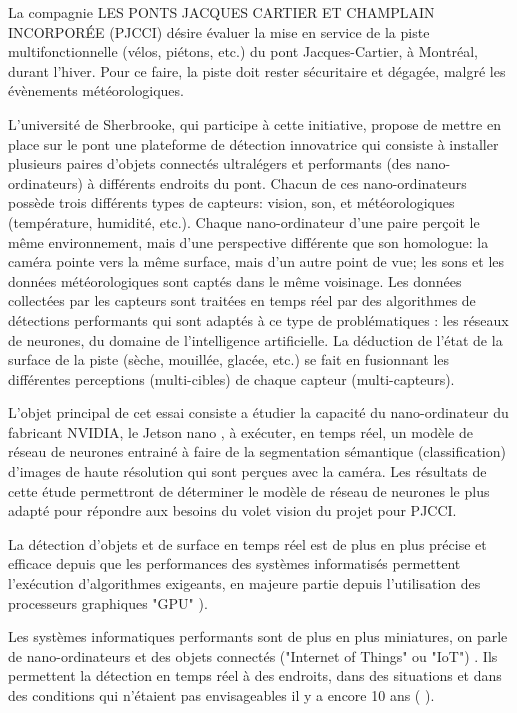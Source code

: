 \par La compagnie LES PONTS JACQUES CARTIER ET CHAMPLAIN INCORPORÉE (PJCCI) désire évaluer la mise en service de la piste multifonctionnelle (vélos, piétons, etc.) du pont Jacques-Cartier, à Montréal, durant l'hiver. Pour ce faire, la piste doit rester sécuritaire et dégagée, malgré les évènements météorologiques.
\par L'université de Sherbrooke, qui participe à cette initiative, propose de mettre en place sur le pont une plateforme de détection innovatrice qui consiste à installer plusieurs paires d'objets connectés ultralégers et performants (des nano-ordinateurs) à différents endroits du pont. Chacun de ces nano-ordinateurs possède trois différents types de capteurs: vision, son, et météorologiques (température, humidité, etc.). Chaque nano-ordinateur d'une paire perçoit le même environnement, mais d'une perspective différente que son homologue: la caméra pointe vers la même surface, mais d'un autre point de vue; les sons et les données météorologiques sont captés dans le même voisinage. Les données collectées par les capteurs sont traitées en temps réel par des algorithmes de détections performants qui sont adaptés à ce type de problématiques : les réseaux de neurones, du domaine de l'intelligence artificielle. La déduction de l'état de la surface de la piste (sèche, mouillée, glacée, etc.) se fait en fusionnant les différentes perceptions (multi-cibles) de chaque capteur (multi-capteurs).
\par L'objet principal de cet essai consiste a étudier la capacité du nano-ordinateur du fabricant NVIDIA, le Jetson nano \cite{nvidia_jetson_2019}, à exécuter, en temps réel, un modèle de réseau de neurones entrainé à faire de la segmentation sémantique (classification) d'images de haute résolution qui sont perçues avec la caméra. Les résultats de cette étude permettront de déterminer le modèle de réseau de neurones le plus adapté pour répondre aux besoins du volet vision du projet pour PJCCI. 
\par La détection d'objets et de surface en temps réel est de plus en plus précise et efficace depuis que les performances des systèmes informatisés permettent l'exécution d'algorithmes exigeants, en majeure partie depuis l'utilisation des processeurs graphiques "GPU" \cite{chong_real-time_1992} \cite{dettmers_deep_2015} \cite{beam_deep_2017} \cite{jiaconda_concise_2019} \cite{jia_real-time_2020} \cite{kurenkov_brief_2015}). 
\par Les systèmes informatiques performants sont de plus en plus miniatures, on parle de nano-ordinateurs et des objets connectés ("Internet of Things" ou "IoT") \cite{blanco-filgueira_deep_2019} \cite{sharma_history_2019}. Ils permettent la détection en temps réel à des endroits, dans des situations et dans des conditions qui n'étaient pas envisageables il y a encore 10 ans (\cite{jia_real-time_2020} \cite{bernas_edge_2017} \cite{abouzahir_iot-empowered_2017} \cite{blanco-filgueira_deep_2019}).
